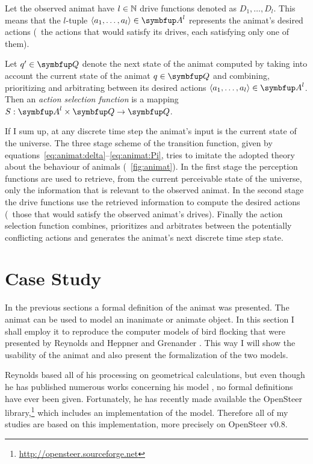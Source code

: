 Let the observed animat have $l \in \mathbb{N}$ drive functions denoted as $D_1,\ldots,D_l$. This means that the $l$-tuple $\langle a_1,\ldots,a_l\rangle \in \set{A}^l$ represents the animat's desired actions (\ie\ the actions that would satisfy its drives, each satisfying only one of them). 

\begin{definition}
	\label{def:animat:S}
	Let $q' \in \set{Q}$ denote the next state of the animat computed by taking into account the current state of the animat $q \in \set{Q}$ and combining, prioritizing and arbitrating between its desired actions $\langle a_1,\ldots,a_l\rangle \in \set{A}^l$. Then an \emph{action selection function} is a mapping $S: \set{A}^l \times \set{Q} \rightarrow \set{Q}$.
\end{definition}

If I sum up, at any discrete time step the animat's input is the current state of the universe. The three stage scheme of the transition function, given by equations~\eqref{eq:animat:delta}--\eqref{eq:animat:Pi}, tries to imitate the adopted theory about the behaviour of animals (\fig~\ref{fig:animat}). In the first stage the perception functions are used to retrieve, from the current perceivable state of the universe, only the information that is relevant to the observed animat. In the second stage the drive functions use the retrieved information to compute the desired actions (\ie\ those that would satisfy the observed animat's drives). Finally the action selection function combines, prioritizes and arbitrates between the potentially conflicting actions and generates the animat's next discrete time step state. 

\section{Case Study}
In the previous sections a formal definition of the animat was  presented. The animat can be used to model an inanimate or animate object. In this section I shall employ it to reproduce the computer models of bird flocking that were presented by Reynolds \cite{reynolds:1987} and Heppner and Grenander \cite{heppner:1990}. This way I will show the usability of the animat and also present the formalization of the two models. 

Reynolds based all of his processing on geometrical calculations, but even though he has published numerous works concerning his model \cite{reynolds:1987,reynolds:1993a,reynolds:1993b,reynolds:1994,reynolds:1999,reynolds:2000}, no formal definitions have ever been given. Fortunately, he has recently made available the OpenSteer library,\footnote{\href{http://opensteer.sourceforge.net}{http://opensteer.sourceforge.net}} which includes an implementation of the model. Therefore all of my studies are based on this implementation, more precisely on OpenSteer v0.8.

